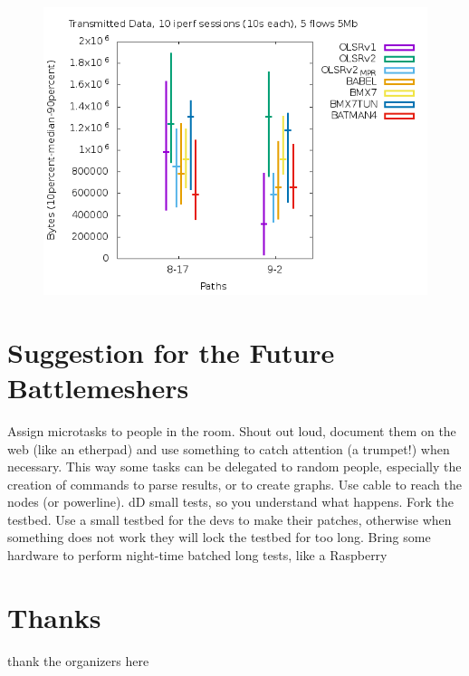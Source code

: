 \documentclass[10pt,onecolumn]{paper}
\begin{document}
\begin{figure}
  \centering
    \includegraphics[width=.9\linewidth]{images/failure_test_iperf_10runs-IPv6-twoflow.png}
    \caption{}
  \label{fig:iperftwoflows}
\end{figure}



\section{Suggestion for the Future Battlemeshers}

\bi
\ii Assign microtasks to people in the room. Shout out loud, document them on
the web (like an etherpad) and use something to catch attention (a trumpet!)
when necessary. This way some tasks can be delegated to random people,
especially the creation of commands to parse results, or to create graphs.
\ii Use cable to reach the nodes (or powerline).
\ii dD small tests, so you understand what happens.
\ii Fork the testbed. Use a small testbed for the devs to make their patches,
otherwise when something does not work they will lock the testbed for too long.
\ii Bring some hardware to perform night-time batched long tests, like a
Raspberry
\ei 


\section{Thanks}
thank the organizers here


\end{document}
